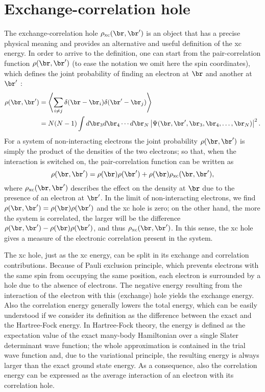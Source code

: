 \chapter{Exchange-correlation hole\label{app:xc-hole}}
The exchange-correlation hole $\rho_{\rm xc}(\br,\br')$ is an object that has a precise physical meaning and provides an alternative and useful definition of the xc energy. In order to arrive to the definition, one can start from the pair-correlation function $\rho(\br,\br')$ (to ease the notation we omit here the spin coordinates), which defines the joint probability of finding an electron at $\br$ and another at $\br'$ \cite{martin_interacting_2016}:
%
\begin{equation}
    \begin{split}
    \rho(\br,\br') &= \left\langle \sum_{i \neq j} \delta(\br - \br_i) \delta(\br' - \br_j) \right\rangle \\
    &= N(N-1) \int d\br_3 d\br_4 \cdots d\br_N \left| \Psi(\br,\br',\br_3,\br_4,\dots,\br_N) \right|^2 .
    \end{split}
    \label{eq:pair-corr-function}
\end{equation}
%
For a system of non-interacting electrons the joint probability $\rho(\br,\br')$ is simply the product of the densities of the two electrons; so that, when the interaction is switched on, the pair-correlation function can be written as
%
\begin{equation}
    \rho(\br,\br') = \rho(\br)\rho(\br') + \rho(\br)\rho_{\rm xc}(\br,\br') ,
    \label{eq:pair-corr-xc-hole}
\end{equation}
%
where $\rho_{\rm xc}(\br,\br')$ describes the effect on the density at $\br$ due to the presence of an electron at $\br'$. In the limit of non-interacting electrons, we find $\rho(\br,\br') = \rho(\br)\rho(\br')$ and the xc hole is zero; on the other hand, the more the system is correlated, the larger will be the difference $\rho(\br,\br') - \rho(\br)\rho(\br')$, and thus $\rho_{\rm xc}(\br,\br')$. In this sense, the xc hole gives a measure of the electronic correlation present in the system.

The xc hole, just as the xc energy, can be split in its exchange and correlation contributions. Because of Pauli exclusion principle, which prevents electrons with the same spin from occupying the same position, each electron is surrounded by a hole due to the absence of electrons. The negative energy resulting from the interaction of the electron with this (exchange) hole yields the exchange energy. Also the correlation energy generally lowers the total energy, which can be easily understood if we consider its definition as the difference between the exact and the Hartree-Fock energy. In Hartree-Fock theory, the energy is defined as the expectation value of the exact many-body Hamiltonian over a single Slater determinant wave function; the whole approximation is contained in the trial wave function and, due to the variational principle, the resulting energy is always larger than the exact ground state energy. As a consequence, also the correlation energy can be expressed as the average interaction of an electron with its correlation hole.


